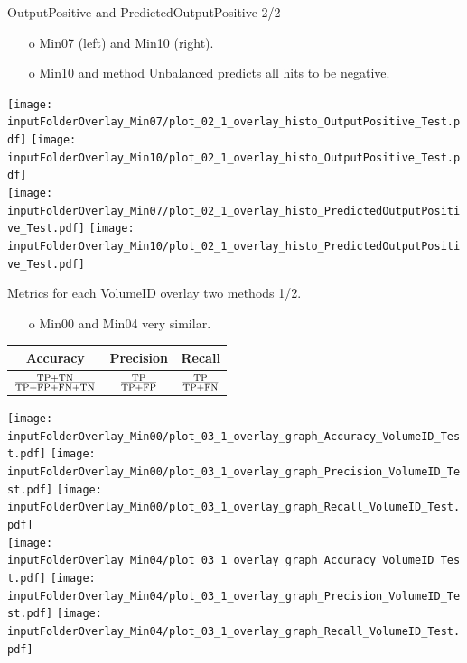 \documentclass{beamer}
\begin{document}
\begin{frame}{OutputPositive and PredictedOutputPositive 2/2}
\begin{enumerate}
\item[o] Min07 (left) and Min10 (right).
\item[o] Min10 and method Unbalanced predicts all hits to be negative.
\end{enumerate}
\centering
\texttt{[image: \\inputFolderOverlay\_Min07/plot\_02\_1\_overlay\_histo\_OutputPositive\_Test.pdf]}
\texttt{[image: \\inputFolderOverlay\_Min10/plot\_02\_1\_overlay\_histo\_OutputPositive\_Test.pdf]}\\
\texttt{[image: \\inputFolderOverlay\_Min07/plot\_02\_1\_overlay\_histo\_PredictedOutputPositive\_Test.pdf]}
\texttt{[image: \\inputFolderOverlay\_Min10/plot\_02\_1\_overlay\_histo\_PredictedOutputPositive\_Test.pdf]}\\
\end{frame}

\begin{frame}{Metrics for each VolumeID overlay two methods 1/2.}
\begin{enumerate}
\item[o] Min00 and Min04 very similar. 
\end{enumerate}
\centering
\begin{center}
\begin{tabular}{ |c|c|c| } 
\hline
Accuracy & Precision & Recall \\ 
\hline
$\frac{\TP+\TN}{\TP+\FP+\FN+\TN}$ & $\frac{\TP}{\TP+\FP}$  & $\frac{\TP}{\TP+\FN}$ \\ 
\hline
\end{tabular}
\end{center}
\texttt{[image: \\inputFolderOverlay\_Min00/plot\_03\_1\_overlay\_graph\_Accuracy\_VolumeID\_Test.pdf]}
\texttt{[image: \\inputFolderOverlay\_Min00/plot\_03\_1\_overlay\_graph\_Precision\_VolumeID\_Test.pdf]}
\texttt{[image: \\inputFolderOverlay\_Min00/plot\_03\_1\_overlay\_graph\_Recall\_VolumeID\_Test.pdf]}\\
\texttt{[image: \\inputFolderOverlay\_Min04/plot\_03\_1\_overlay\_graph\_Accuracy\_VolumeID\_Test.pdf]}
\texttt{[image: \\inputFolderOverlay\_Min04/plot\_03\_1\_overlay\_graph\_Precision\_VolumeID\_Test.pdf]}
\texttt{[image: \\inputFolderOverlay\_Min04/plot\_03\_1\_overlay\_graph\_Recall\_VolumeID\_Test.pdf]}\\
\end{frame}
\end{document}
